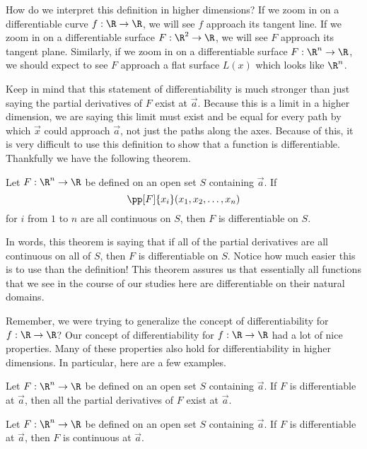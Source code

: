 \documentclass{ximera}
\begin{document}
How do we interpret this definition in higher dimensions?  If we zoom
in on a differentiable curve $f:\R \to \R$, we will see $f$ approach
its tangent line. If we zoom in on a differentiable surface $F:\R^2
\to \R$, we will see $F$ approach its tangent plane.  Similarly, if we
zoom in on a differentiable surface $F:\R^n \to \R$, we should expect
to see $F$ approach a flat surface $L(x)$ which looks like $\R^n$.

Keep in mind that this statement of differentiability is much stronger
than just saying the partial derivatives of $F$ exist at $\vec{a}$.
Because this is a limit in a higher dimension, we are saying this
limit must exist and be equal for every path by which $\vec{x}$ could
approach $\vec{a}$, not just the paths along the axes.  Because of
this, it is very difficult to use this definition to show that a
function is differentiable.  Thankfully we have the following theorem.

\begin{theorem}
  Let $F:\R^n\to\R$ be defined on an open set $S$ containing
  $\vec{a}$.  If
  \[
  \pp[F]{x_i}(x_1, x_2, \dots, x_n)
  \]
 for $i$ from $1$ to $n$ are all continuous on $S$, then $F$ is differentiable on $S$.
\end{theorem}

In words, this theorem is saying that if all of the partial derivatives are all continuous on all of $S$, then $F$ is differentiable on $S$.  Notice how much easier this is to use than the definition! This theorem assures us that essentially all functions that we see in
the course of our studies here are differentiable on their natural domains.

Remember, we were trying to generalize the concept of differentiability for $f:\R \to \R$?  Our concept of differentiability for $f:\R \to \R$ had a lot of nice properties.  Many of these properties also hold for differentiability in higher dimensions.  In particular, here are a few examples.

\begin{theorem}
Let $F:\R^n\to\R$ be defined on an open set $S$ containing
$\vec{a}$.  If $F$ is differentiable at $\vec{a}$, then all the partial derivatives of $F$ exist at $\vec{a}$.
\end{theorem}

\begin{theorem}
Let $F:\R^n\to\R$ be defined on an open set $S$ containing
$\vec{a}$.  If $F$ is differentiable at $\vec{a}$, then $F$ is
continuous at $\vec{a}$.
\end{theorem}
\end{document}
